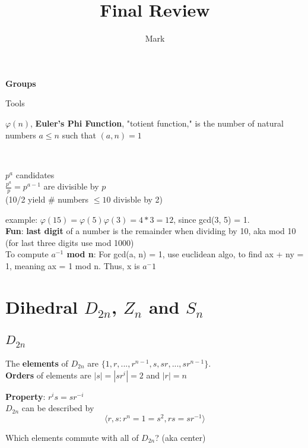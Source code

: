 \documentclass[12pt]{article}
\title{Final Review}
\author{Mark}
\date{}
\begin{document}
\maketitle
\centerline{\LARGE \textbf{Groups}}
\medskip


\centerline{Tools}
$\varphi(n)$, \textbf{Euler's Phi Function}, "totient function," is the number of natural numbers $a \leq n$ such that $(a, n) = 1$\\

\centerline{}
\ \\
\centerline{}

\textcolor[gray]{0.5}{
$p^a$ candidates \\
$\frac{p^a}{p} = p^{a-1}$ are divisible by $p$ \\
(10/2 yield \# numbers $\leq 10$ divisble by 2)} 
\medskip

example: $\varphi(15) = \varphi(5) \varphi(3) = 4*3 = 12$, since gcd(3, 5) = 1. \\

\textbf{Fun}: \textbf{last digit} of a number is the remainder when dividing by 10, aka mod 10
(for last three digits use mod 1000)\\

To compute \textbf{$a^{-1}$ mod n}: 
 For gcd(a, n) = 1, use euclidean algo, to find ax + ny = 1, meaning ax = 1 mod n. Thus, x is $a^-1$



\section*{Dihedral $D_{2n}$, $Z_n$ and $S_n$}
\subsection*{$D_{2n}$}
The \textbf{elements} of $D_{2n}$ are $\{1, r,...,r^{n-1}, s, sr, ..., sr^{n-1}\}$.\\

\textbf{Orders} of elements are $|s| = |sr^i| = 2$ and $|r| = n$

\textbf{Property}: $r^i s = sr^{-i}$\\

$D_{2n}$ can be described by  
$$\langle r, s: r^n = 1 = s^2, rs = sr^{-1} \rangle$$

Which elements commute with all of $D_{2n}$? (aka center)\\
\end{document}
